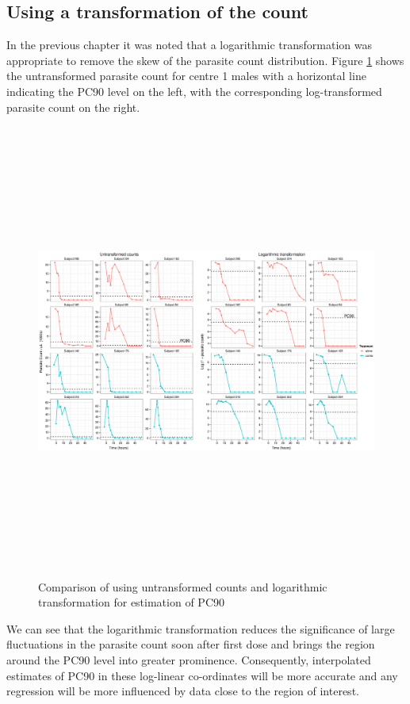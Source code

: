 \subsection{Using a transformation of the count}
In the previous chapter it was noted that a logarithmic transformation was appropriate to remove the skew of the parasite count distribution. Figure \ref{comprawlog} shows the untransformed parasite count for centre 1 males with a horizontal line indicating the PC90 level on the left, with the corresponding log-transformed parasite count on the right.
\begin{figure}
\begin{center}
\includegraphics[height=150mm]{comprawlog90.eps}
\caption{Comparison of using untransformed counts and logarithmic transformation for estimation of PC90}
\label{comprawlog}
\end{center}
\end{figure}

We can see that the logarithmic transformation reduces the significance of large fluctuations in the parasite count soon after first dose and brings the region around the PC90 level into greater prominence. Consequently, interpolated estimates of PC90 in these log-linear co-ordinates will be more accurate and any regression will be more influenced by data close to the region of interest.  

